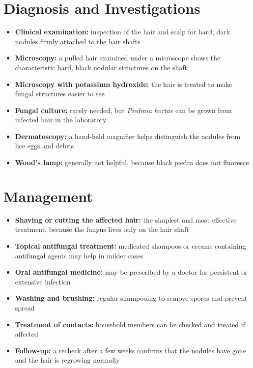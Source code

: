 \section*{Diagnosis and Investigations}
\begin{itemize}
    \item \textbf{Clinical examination:} inspection of the hair and scalp for hard, dark nodules firmly attached to the hair shafts
    \item \textbf{Microscopy:} a pulled hair examined under a microscope shows the characteristic hard, black nodular structures on the shaft
    \item \textbf{Microscopy with potassium hydroxide:} the hair is treated to make fungal structures easier to see
    \item \textbf{Fungal culture:} rarely needed, but \textit{Piedraia hortae} can be grown from infected hair in the laboratory
    \item \textbf{Dermatoscopy:} a hand-held magnifier helps distinguish the nodules from lice eggs and debris
    \item \textbf{Wood's lamp:} generally not helpful, because black piedra does not fluoresce
\end{itemize}

\section*{Management}
\begin{itemize}
    \item \textbf{Shaving or cutting the affected hair:} the simplest and most effective treatment, because the fungus lives only on the hair shaft
    \item \textbf{Topical antifungal treatment:} medicated shampoos or creams containing antifungal agents may help in milder cases
    \item \textbf{Oral antifungal medicine:} may be prescribed by a doctor for persistent or extensive infection
    \item \textbf{Washing and brushing:} regular shampooing to remove spores and prevent spread
    \item \textbf{Treatment of contacts:} household members can be checked and treated if affected
    \item \textbf{Follow-up:} a recheck after a few weeks confirms that the nodules have gone and the hair is regrowing normally
\end{itemize}

